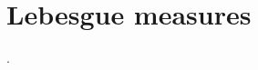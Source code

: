 \section{Lebesgue measures}\label{sec:lebesgue_measures}

\begin{definition}\label{def:lebesgue_measure}
  .
\end{definition}
